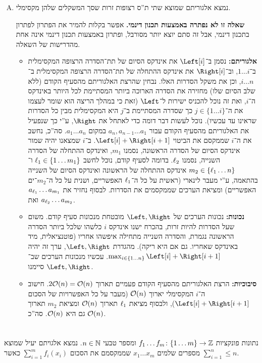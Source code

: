 \documentclass[]{../../../../tex/classes/homework}
\begin{document}
\begin{enumerate}[(A)]
		\item נמצא אלגוריתם שמוצא שתי ת''ס רצופות זרות שסך המשקלים שלהן מקסימלי. 
		
		\textbf{שאלה זו לא נפתרה באמצעות תכנון דינמי. }אפשר בקלות להמיר את הפתרון לפתרון בתכנון דינמי, אבל זה סתם יוצא יותר מסורבל, ופתרון באמצעות תכנון דינמי אינה אחת מהדרישות של השאלה. 
		\begin{itemize}
			\item \textbf{אלגוריתם: }נסמן ב־$\Left[i]$ את אינדקס הסיום של תת־הסדרה הרצופה המקסימלית ב־$1 \dots i$, וב־$\Right[i]$ את אינדקס ההתחלה של תת־הסדרה הרצופה המקסימלית ב־$i \dots n$, וכן את משקל הסדרות האלו. נבחין שהרצת האלגוריתם מהסעיף הקודם (ללא שלב הסיום שלו) מחזירה את הסדרה הארוכה ביותר המסתיימת לכל היותר באינדקס ה־$i$, ואת זה נוכל להכניס ישירות ל־$\Left$ (זאת כי במהלך הריצה הוא שומר לעצמו את ה־$j \in \{1 \dots i\}$ כך שסדרה המסתיימת ב־$j$ היא המקסימלית מבין כל הסדרות שראינו עד עכשיו). נוכל לעשות דבר דומה כדי לאתחל את $\Right$, ע''י כך שנפעיל את האלגוריתם מהסעיף הקודם עבור $a_n, a_{n - 1} \dots a_1$ במקום $a_1 \dots a_n$. סה''כ, נחשב את ה־$i$ שממקסם את הביטוי $\Left[i] + \Right[i + 1]$. ב־$i$ שמצאנו יהיה שמור אינדקס הסיום של הסדרה הראשונה, נסמנו $m_1$, ואינדקס ההתחלה של הסדרה השנייה, נסמנו $\ell_2$. בדומה לסעיף קודם, נוכל לחשב $\ell_1 \in \{1 \dots m_1\}$ ו־$m_2 \in \{\ell_1 \dots n\}$ אינדקס ההתחלה של הראשונה ואינדקס הסיום של השנייה בהתאמה, ע''י מעבר לינארי (ראשית על כל ה־$\ell_1$ האפשריים, ושנית על כל ה־$m_2$־ים האפשריים) ומציאת הערכים שממקסמים את הסדרות. לבסוף נחזיר את $a_{\ell_1}\dots a_{m_1}$ ואת $a_{\ell_2} \dots a_{m_2}$. 
			\item \textbf{נכונות: }נכונות הערכים של $\Left, \Right$ מובטחת מנכונות סעיף קודם. משום שעל הסדרות להיות זרות, בהכרח ישנו אינדקס $i$ כלשהו שלכל ביותר הסדרה הראשונה נגמרת, והסדרה השנייה מתחילה איפשהו אחריו (פוטנציאלית, מיד באינדקס שאחריו. גם אם היא ריקה). מהגדרת $\Left, \Right$, ערך זה יהיה $\max_{i \in \{1 \dots n\}}\Left[i]+\Right[i + 1]$. עכשיו מנכונות הערכים שב־$\Left, \Right$ סיימנו. 
			\item \textbf{סיבוכיות: }הרצת האלגוריתם מהסעיף הקודם פעמיים תארוך $2\mathcal{O}(n) = \mathcal{O}(n)$. חישוב ה־$i$ המקסימלי יארוך $\mathcal{O}(n)$ (מעבר על כל האפשרויות של הסכום $\Left[i] + \Right[i + 1]$), ולבסוף מציאת $\ell_1$ תארוך $\mathcal{O}(n)$ ומציאת $m_2$ תארוך גם היא $\mathcal{O}(n)$. סה''כ $\mathcal{O}(n)$. 
		\end{itemize}
	\end{enumerate}
	\newpage
	
\section{}%
	נתונות פונקציות $f_1 \dots f_m \colon \{1 \dots m\} \to \mathbb{Z}$ ומספר טבעי $n \in \mathbb{N}$. נמצא אלגויתם יעיל שמוצא מספרים שלמים $x_1 \dots x_m$ שממקסמם את הסכום $\sum_{i = 1}^{m} f_i(x_i)$ כאשר $\sum_{i = 1}^{n} \le n$. 
	
\end{document}
